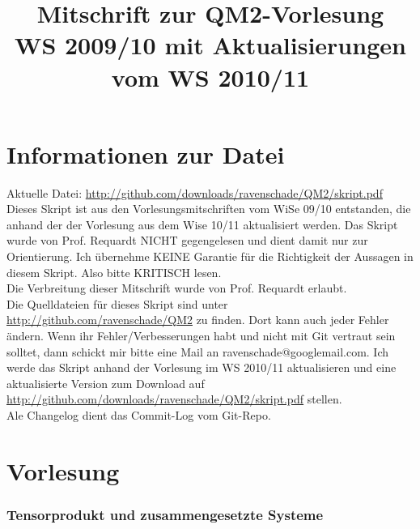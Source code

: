 \documentclass[twoside,a4paper]{scrartcl}
\renewcommand{\1}{\mathds{1}}
\begin{document}

\clearpage
\thispagestyle{empty}

	
\title{\huge  \textbf{Mitschrift zur QM2-Vorlesung}\\
			  \textbf{WS 2009/10 mit Aktualisierungen vom WS 2010/11}}
		
\maketitle
\newpage
\thispagestyle{empty}
\mbox{}
\newpage
\tableofcontents
\newpage
\thispagestyle{empty}
\mbox{}
\newpage
\newpage
\part{Informationen zur Datei}
Aktuelle Datei: \url{http://github.com/downloads/ravenschade/QM2/skript.pdf}\\
Dieses Skript ist aus den Vorlesungsmitschriften vom WiSe 09/10 entstanden, die anhand der der Vorlesung aus dem Wise 10/11 aktualisiert werden. Das Skript wurde von Prof. Requardt NICHT gegengelesen und dient damit nur zur Orientierung. Ich übernehme KEINE Garantie für die Richtigkeit der Aussagen in diesem Skript. Also bitte KRITISCH lesen.\\
Die Verbreitung dieser Mitschrift wurde von Prof. Requardt erlaubt.\\
Die Quelldateien für dieses Skript sind unter \url{http://github.com/ravenschade/QM2} zu finden. Dort kann auch jeder Fehler ändern. Wenn ihr Fehler/Verbesserungen habt und nicht mit Git vertraut sein solltet, dann schickt mir bitte eine Mail an ravenschade@googlemail.com.
Ich werde das Skript anhand der Vorlesung im WS 2010/11 aktualisieren und eine aktualisierte Version zum Download auf \url{http://github.com/downloads/ravenschade/QM2/skript.pdf} stellen.\\
Ale Changelog dient das Commit-Log vom Git-Repo.
\newpage

%
%
%
%
%
%

\part{Vorlesung}
\section{Tensorprodukt und zusammengesetzte Systeme}
\end{document}
